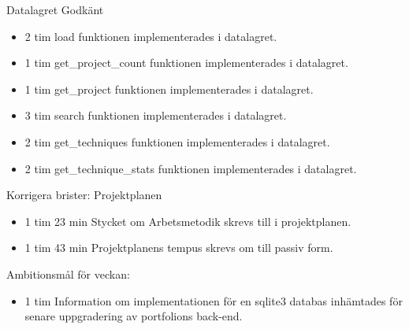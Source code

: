 \documentclass{TDP003mall}
\begin{document}
Datalagret Godkänt
\begin{itemize}
\item 2 tim load funktionen implementerades i datalagret.
\item 1 tim get\_project\_count funktionen implementerades i datalagret.
\item 1 tim get\_project funktionen implementerades i datalagret.
\item 3 tim search funktionen implementerades i datalagret.
\item 2 tim get\_techniques funktionen implementerades i datalagret.
\item 2 tim get\_technique\_stats funktionen implementerades i datalagret.
\end{itemize}

Korrigera brister: Projektplanen
\begin{itemize}
\item 1 tim 23 min Stycket om Arbetsmetodik skrevs till i projektplanen.
  \item 1 tim 43 min Projektplanens tempus skrevs om till passiv form.
  \end{itemize}

Ambitionsmål för veckan:
\begin{itemize}
\item 1 tim Information om implementationen för en sqlite3 databas inhämtades för senare uppgradering av portfolions back-end.
  \end{itemize}

\newpage
  
\end{document}
